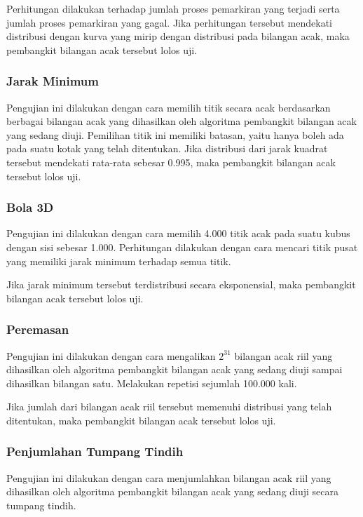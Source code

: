 \documentclass[conference]{IEEEtran}
\begin{document}
Perhitungan dilakukan terhadap jumlah proses pemarkiran yang terjadi serta jumlah proses pemarkiran yang gagal. Jika perhitungan tersebut mendekati distribusi dengan kurva yang mirip dengan distribusi pada bilangan acak, maka pembangkit bilangan acak tersebut lolos uji.

\subsubsection{Jarak Minimum}

Pengujian ini dilakukan dengan cara memilih titik secara acak berdasarkan berbagai bilangan acak yang dihasilkan oleh algoritma pembangkit bilangan acak yang sedang diuji.
Pemilihan titik ini memiliki batasan, yaitu hanya boleh ada pada suatu kotak yang telah ditentukan.
Jika distribusi dari jarak kuadrat tersebut mendekati rata-rata sebesar 0.995, maka pembangkit bilangan acak tersebut lolos uji.

\subsubsection{Bola 3D}

Pengujian ini dilakukan dengan cara memilih 4.000 titik acak pada suatu kubus dengan sisi sebesar 1.000.
Perhitungan dilakukan dengan cara mencari titik pusat yang memiliki jarak minimum terhadap semua titik.

Jika jarak minimum tersebut terdistribusi secara eksponensial, maka pembangkit bilangan acak tersebut lolos uji.

\subsubsection{Peremasan}

Pengujian ini dilakukan dengan cara mengalikan $2^31$ bilangan acak riil yang dihasilkan oleh algoritma pembangkit bilangan acak yang sedang diuji sampai dihasilkan bilangan satu.
Melakukan repetisi sejumlah 100.000 kali.

Jika jumlah dari bilangan acak riil tersebut memenuhi distribusi yang telah ditentukan, maka pembangkit bilangan acak tersebut lolos uji.

\subsubsection{Penjumlahan Tumpang Tindih}

Pengujian ini dilakukan dengan cara menjumlahkan bilangan acak riil yang dihasilkan oleh algoritma pembangkit bilangan acak yang sedang diuji secara tumpang tindih.
\end{document}
